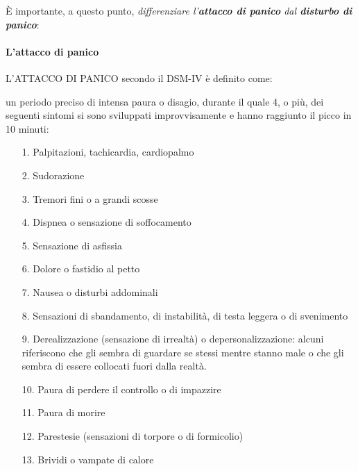 È importante, a questo punto, \emph{differenziare l'\textbf{attacco di
panico} dal \textbf{disturbo di panico}}:

\paragraph{L'attacco di panico}

L'ATTACCO DI PANICO secondo il DSM-IV è definito come:

un periodo preciso di intensa paura o disagio, durante il quale 4, o
più, dei seguenti sintomi si sono sviluppati improvvisamente e hanno
raggiunto il picco in 10 minuti:

\begin{itemize}
\item[1.]
  Palpitazioni, tachicardia, cardiopalmo
\item[2.]
  Sudorazione
\item[3.]
  Tremori fini o a grandi scosse
\item[4.]
  Dispnea o sensazione di soffocamento
\item[5.]
  Sensazione di asfissia
\item[6.]
  Dolore o fastidio al petto
\item[7.]
  Nausea o disturbi addominali
\item[8.]
  Sensazioni di sbandamento, di instabilità, di testa leggera o di
  svenimento
\item[9.]
  Derealizzazione (sensazione di irrealtà) o depersonalizzazione: alcuni
  riferiscono che gli sembra di guardare se stessi mentre stanno male o
  che gli sembra di essere collocati fuori dalla realtà.
\item[10.]
  Paura di perdere il controllo o di impazzire
\item[11.]
  Paura di morire
\item[12.]
  Parestesie (sensazioni di torpore o di formicolio)
\item[13.]
  Brividi o vampate di calore
\end{itemize}

